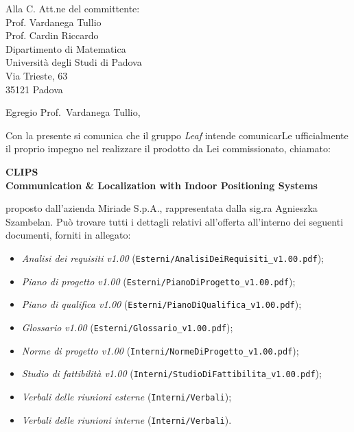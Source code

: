 \documentclass[a4paper,12pt]{letteracdp}
\author{Federico Tavella}
\date{22 gennaio 2016}
\begin{document}
	\begin{letter}{
		Alla C. Att.ne del committente: \\
		Prof. Vardanega Tullio \\
		Prof. Cardin Riccardo \\
		Dipartimento di Matematica \\
		Università degli Studi di Padova \\
		Via Trieste, 63 \\
		35121 Padova}
		
		\opening{Egregio Prof.~Vardanega Tullio,}
		Con la presente si comunica che il gruppo \textit{Leaf} intende comunicarLe ufficialmente il proprio impegno nel realizzare il prodotto da Lei commissionato, chiamato:
\begin{center}
	\textbf{CLIPS \\ Communication \& Localization with Indoor Positioning Systems}
\end{center}
proposto dall'azienda Miriade S.p.A., rappresentata dalla sig.ra Agnieszka Szambelan.
Può trovare tutti i dettagli relativi all'offerta all'interno dei seguenti documenti, forniti in allegato:

\begin{itemize}
	\item \textit{Analisi dei requisiti v1.00} (\texttt{Esterni/AnalisiDeiRequisiti\_v1.00.pdf});

	\item \textit{Piano di progetto v1.00} (\texttt{Esterni/PianoDiProgetto\_v1.00.pdf});

	\item \textit{Piano di qualifica v1.00} (\texttt{Esterni/PianoDiQualifica\_v1.00.pdf});
	
	\item \textit{Glossario v1.00} (\texttt{Esterni/Glossario\_v1.00.pdf});
	
	\item \textit{Norme di progetto v1.00} (\texttt{Interni/NormeDiProgetto\_v1.00.pdf});

	\item \textit{Studio di fattibilità v1.00} (\texttt{Interni/StudioDiFattibilita\_v1.00.pdf});

	\item \textit{Verbali delle riunioni esterne}	(\texttt{Interni/Verbali});
	
	\item \textit{Verbali delle riunioni interne} (\texttt{Interni/Verbali}).
	

\end{itemize}
\end{letter}
\end{document}
